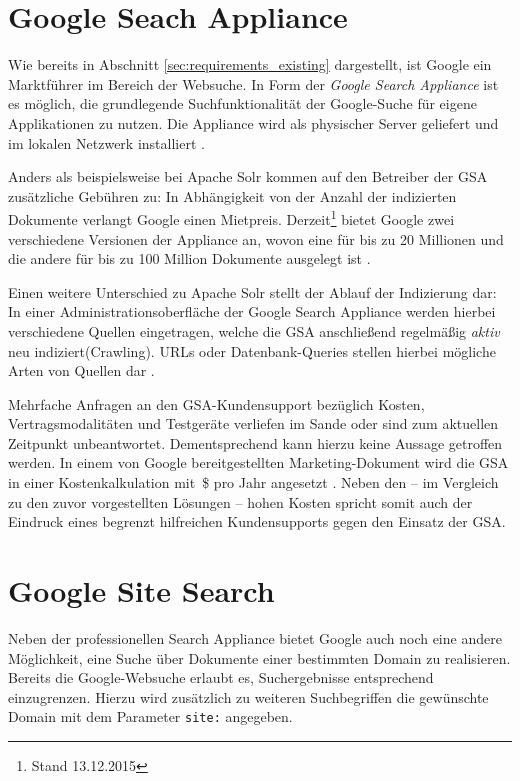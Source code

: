 \section{Google Seach Appliance}
\label{sec:market_google_search_app}

Wie bereits in Abschnitt \ref{sec:requirements_existing} dargestellt, ist Google ein Marktführer im Bereich der Websuche. In Form der \emph{Google Search Appliance} ist es möglich, die grundlegende Suchfunktionalität der Google-Suche für eigene Applikationen zu nutzen. Die Appliance wird als physischer Server geliefert und im lokalen Netzwerk installiert \cite{Google.2015b}.

Anders als beispielsweise bei Apache Solr kommen auf den Betreiber der GSA zusätzliche Gebühren zu: In Abhängigkeit von der Anzahl der indizierten Dokumente verlangt Google einen Mietpreis. Derzeit\footnote{Stand 13.12.2015} bietet Google zwei verschiedene Versionen der Appliance an, wovon eine für bis zu 20 Millionen und die andere für bis zu 100 Million Dokumente ausgelegt ist \cite{Google.2015b}.

Einen weitere Unterschied zu Apache Solr stellt der Ablauf der Indizierung dar: In einer Administrationsoberfläche der Google Search Appliance werden hierbei verschiedene Quellen eingetragen, welche die GSA anschließend regelmäßig \emph{aktiv} neu indiziert(Crawling). URLs oder Datenbank-Queries stellen hierbei mögliche Arten von Quellen dar \cite[S. 17, 26]{Google.2012}.

Mehrfache Anfragen an den GSA-Kundensupport bezüglich Kosten, Vertragsmodalitäten und Testgeräte verliefen im Sande oder sind zum aktuellen Zeitpunkt unbeantwortet. Dementsprechend kann hierzu keine Aussage getroffen werden. In einem von Google bereitgestellten Marketing-Dokument wird die GSA in einer Kostenkalkulation mit \,\$ pro Jahr angesetzt \cite{Google.2013}. Neben den -- im Vergleich zu den zuvor vorgestellten Lösungen -- hohen Kosten spricht somit auch der Eindruck eines begrenzt hilfreichen Kundensupports gegen den Einsatz der GSA.

\section{Google Site Search}
\label{sec:market_google_site}
Neben der professionellen Search Appliance bietet Google auch noch eine andere Möglichkeit, eine Suche über Dokumente einer bestimmten Domain zu realisieren. Bereits die Google-Websuche erlaubt es, Suchergebnisse entsprechend einzugrenzen. Hierzu wird zusätzlich zu weiteren Suchbegriffen die gewünschte Domain mit dem Parameter \texttt{site:} angegeben.


